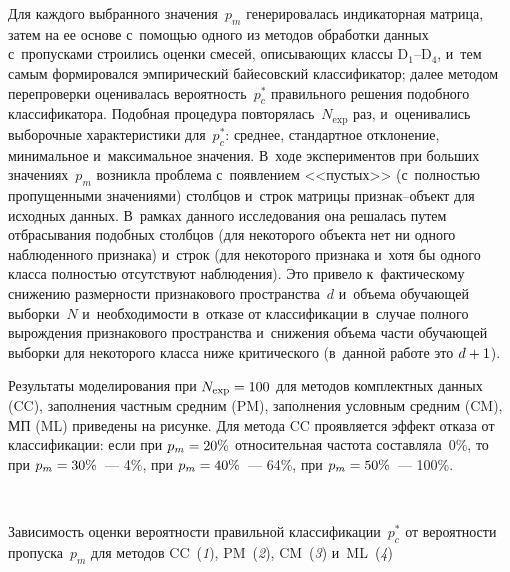\begin{multicols}{2}
     Для каждого выбранного значения~$p_m$ генерировалась индикаторная 
матрица, затем на ее основе с~помощью одного из методов обработки данных 
с~пропусками строились оценки смесей, описывающих классы D$_1$--D$_4$, 
и~тем самым формировался эмпирический байесовский классификатор; далее 
методом перепроверки оценивалась вероятность~$p_c^*$ правильного решения 
подобного классификатора. Подобная процедура повторялась~$N_{\mathrm{exp}}$ раз, 
и~оценивались выборочные характеристики для~$p_c^*$: среднее, стандартное 
отклонение, минимальное и~максимальное значения. В~ходе экспериментов 
при больших значениях~$p_m$ возникла проб\-ле\-ма с~появлением 
<<пустых>> (с~пол\-ностью пропущенными значениями) столбцов и~строк 
матрицы приз\-нак--объ\-ект для исходных данных. В~рамках данного 
исследования она решалась путем отбрасывания подобных столбцов (для 
некоторого объекта нет ни одного наблюденного признака) и~строк (для 
некоторого признака и~хотя бы одного класса полностью отсутствуют 
наблюдения). Это привело к~фактическому снижению размерности 
признакового пространства~$d$ и~объема обучающей выборки~$N$ 
и~необходимости в~отказе от классификации в~случае полного вырождения 
признакового пространства и~снижения объема части обучающей выборки для 
некоторого класса ниже критического (в~данной работе это 
     $d\hm+1$). 
     
     Результаты моделирования при $N_{\mathrm{exp}}\hm=100$ для методов 
комплектных данных (CC), заполнения частным средним (PM), заполнения 
условным средним (CM), МП (ML) приведены на 
рисунке. Для метода CC проявляется эффект отказа от классификации: если 
при $p_m\hm=20\%$ относительная  частота 
 составляла~0\%, то при 
$p_m\hm=30\%$~--- 4\%, при $p_m\hm=40\%$~---  64\%, при  
$p_m\hm=50\%$~--- 100\%. 


 { \begin{center}  %
 \vspace*{-4pt}
 \mbox{%
\epsfxsize=77.656mm
}


\end{center}


\noindent
{\small{Зависимость оценки вероятности правильной классификации~$p_c^*$ от вероятности 
пропуска~$p_m$ для методов CC~(\textit{1}), PM~(\textit{2}), CM~(\textit{3}) 
и~ML~(\textit{4})}}

}

\vspace*{12pt}

\addtocounter{figure}{1}







\end{multicols}
